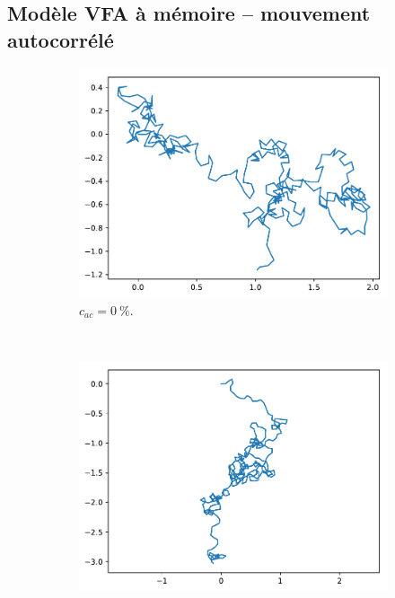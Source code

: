 \begin{appendices}
	
	
	
	
	
	














\section{Modèle VFA à mémoire -- mouvement autocorrélé}

	\begin{figure}[htb]
		\centering
		\begin{subfigure}[t]{\subImgWarea}
			\centering
			\includegraphics[width=\textwidth]{figures/ch3/2_19_autocorr_2_19_180_32_0_0}
			\caption{$c_{ac} = 0~\%$.}
			\label{fig:2_19_autocorr_2_19_180_32_0_0}
		\end{subfigure}
		~
		\begin{subfigure}[t]{\subImgWarea}
			\centering
			\includegraphics[width=\textwidth]{figures/ch3/2_19_autocorr_2_19_180_32_0_4}

\end{subfigure}
\end{figure}
\end{appendices}
